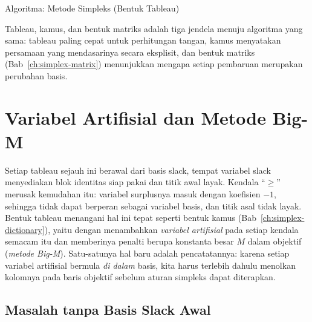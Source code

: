 \begin{algocard}{Algoritma: Metode Simpleks (Bentuk Tableau)}
\end{algocard}

Tableau, kamus, dan bentuk matriks adalah tiga jendela menuju algoritma yang
sama: tableau paling cepat untuk perhitungan tangan, kamus menyatakan persamaan
yang mendasarinya secara eksplisit, dan bentuk matriks
(Bab~\ref{ch:simplex-matrix}) menunjukkan mengapa setiap pembaruan merupakan
perubahan basis.

\section{Variabel Artifisial dan Metode Big-M}
\label{sec:tableau-bigm}

Setiap tableau sejauh ini berawal dari basis slack, tempat variabel slack
menyediakan blok identitas siap pakai dan titik awal layak. Kendala ``$\ge$''
merusak kemudahan itu: variabel surplusnya masuk dengan koefisien $-1$, sehingga
tidak dapat berperan sebagai variabel basis, dan titik asal tidak layak. Bentuk
tableau menangani hal ini tepat seperti bentuk kamus
(Bab~\ref{ch:simplex-dictionary}), yaitu dengan menambahkan \emph{variabel
artifisial} pada setiap kendala semacam itu dan memberinya penalti berupa
konstanta besar $M$ dalam objektif (\emph{metode Big-M}). Satu-satunya hal baru
adalah pencatatannya: karena setiap variabel artifisial bermula \emph{di dalam}
basis, kita harus terlebih dahulu menolkan kolomnya pada baris objektif sebelum
aturan simpleks dapat diterapkan.

\subsection{Masalah tanpa Basis Slack Awal}


